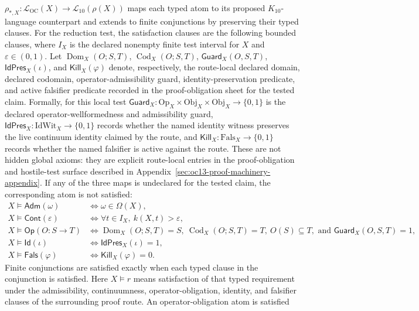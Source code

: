 \(\rho_{\ast,X}:\mathcal{L}_{\mathrm{OC}}(X)\to\mathcal{L}_{10}(\rho(X))\)
maps each typed atom to its proposed \(K_{10}\)-language counterpart and
extends to finite conjunctions by preserving their typed clauses. For the
reduction test, the satisfaction clauses are the following bounded clauses,
where \(I_X\) is the declared nonempty finite test interval for \(X\) and
\(\varepsilon\in(0,1)\). Let
\(\operatorname{Dom}_X(O;S,T)\), \(\operatorname{Cod}_X(O;S,T)\),
\(\mathsf{Guard}_X(O,S,T)\), \(\mathsf{IdPres}_X(\iota)\), and
\(\mathsf{Kill}_X(\varphi)\) denote, respectively, the route-local
declared domain, declared codomain, operator-admissibility guard,
identity-preservation predicate, and active falsifier predicate recorded in the
proof-obligation sheet for the tested claim. Formally, for this local test
\(\mathsf{Guard}_X:\mathrm{Op}_X\times\mathrm{Obj}_X\times\mathrm{Obj}_X
\to\{0,1\}\) is the declared operator-wellformedness and admissibility guard,
\(\mathsf{IdPres}_X:\mathrm{IdWit}_X\to\{0,1\}\) records whether the named
identity witness preserves the live continuum identity claimed by the route,
and \(\mathsf{Kill}_X:\mathrm{Fals}_X\to\{0,1\}\) records whether the named
falsifier is active against the route. These are not hidden global axioms:
they are explicit route-local entries in the proof-obligation and hostile-test
surface described in Appendix~\ref{sec:oc13-proof-machinery-appendix}. If any
of the three maps is undeclared for the tested claim, the corresponding atom is
not satisfied:
\[
\begin{aligned}
X\models\mathsf{Adm}(\omega) &\Longleftrightarrow
  \omega\in\Omega(X),\\
X\models\mathsf{Cont}(\varepsilon) &\Longleftrightarrow
  \forall t\in I_X,\ k(X,t)>\varepsilon,\\
X\models\mathsf{Op}(O:S\to T) &\Longleftrightarrow
  \operatorname{Dom}_X(O;S,T)=S,\ \operatorname{Cod}_X(O;S,T)=T,\ O(S)\subseteq T,\text{ and }
  \mathsf{Guard}_X(O,S,T)=1,\\
X\models\mathsf{Id}(\iota) &\Longleftrightarrow
  \mathsf{IdPres}_X(\iota)=1,\\
X\models\mathsf{Fals}(\varphi) &\Longleftrightarrow
  \mathsf{Kill}_X(\varphi)=0.
\end{aligned}
\]
Finite conjunctions are satisfied exactly when each typed clause in the
conjunction is satisfied. Here
\(X\models r\) means satisfaction of that typed requirement under the
admissibility, continuumness, operator-obligation, identity, and falsifier
clauses of the surrounding proof route. An operator-obligation atom is satisfied
